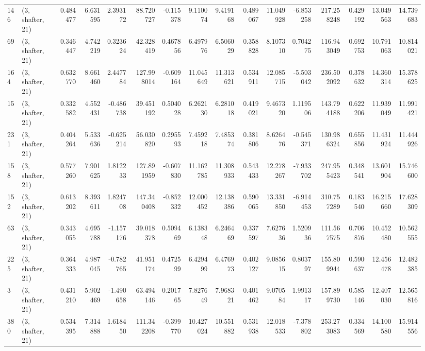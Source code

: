 \begin{tabular}{llrrrrrrrrrrrrrr}
146 &  (3, shafter, 21) &   0.484477 &   6.631595 &   2.393172 &    88.720727 &  -0.115378 &   9.110074 &   9.419168 &  0.489067 &  11.049928 &  -6.853258 &   217.258248 &   0.429192 &  13.049563 &  14.739683 \\
69  &  (3, shafter, 21) &   0.346447 &   4.742219 &   0.323624 &    42.328419 &   0.467856 &   6.497976 &   6.506029 &  0.358828 &   8.107310 &   0.704275 &   116.943049 &   0.692753 &  10.791063 &  10.814021 \\
164 &  (3, shafter, 21) &   0.632770 &   8.661460 &   2.447784 &   127.998014 &  -0.609164 &  11.045649 &  11.313621 &  0.534911 &  12.085715 &  -5.503042 &   236.502092 &   0.378632 &  14.360314 &  15.378625 \\
15  &  (3, shafter, 21) &   0.332582 &   4.552431 &  -0.486738 &    39.451192 &   0.504028 &   6.262130 &   6.281018 &  0.419021 &   9.467320 &   1.119506 &   143.794188 &   0.622206 &  11.939049 &  11.991421 \\
231 &  (3, shafter, 21) &   0.404264 &   5.533636 &  -0.625214 &    56.030820 &   0.295593 &   7.459218 &   7.485374 &  0.381806 &   8.626476 &  -0.545371 &   130.986324 &   0.655856 &  11.431924 &  11.444926 \\
158 &  (3, shafter, 21) &   0.577260 &   7.901625 &   1.812233 &   127.891959 &  -0.607830 &  11.162785 &  11.308933 &  0.543433 &  12.278267 &  -7.933702 &   247.955423 &   0.348541 &  13.601904 &  15.746600 \\
152 &  (3, shafter, 21) &   0.613202 &   8.393611 &   1.824708 &   147.340408 &  -0.852332 &  12.000452 &  12.138386 &  0.590065 &  13.331850 &  -6.914453 &   310.757289 &   0.183540 &  16.215660 &  17.628309 \\
63  &  (3, shafter, 21) &   0.343055 &   4.695788 &  -1.157176 &    39.018378 &   0.509469 &   6.138348 &   6.246469 &  0.337597 &   7.627636 &   1.520936 &   111.567575 &   0.706876 &  10.452480 &  10.562555 \\
225 &  (3, shafter, 21) &   0.364333 &   4.987045 &  -0.782765 &    41.951174 &   0.472599 &   6.429499 &   6.476973 &  0.402127 &   9.085615 &   0.803797 &   155.809944 &   0.590637 &  12.456478 &  12.482385 \\
3   &  (3, shafter, 21) &   0.431210 &   5.902469 &  -1.490658 &    63.494146 &   0.201765 &   7.827649 &   7.968321 &  0.401462 &   9.070584 &   1.991317 &   157.899730 &   0.585146 &  12.407030 &  12.565816 \\
380 &  (3, shafter, 21) &   0.534395 &   7.314888 &   1.618450 &   111.342208 &  -0.399770 &  10.427024 &  10.551882 &  0.531938 &  12.018533 &  -7.378802 &   253.273083 &   0.334569 &  14.100580 &  15.914556 \\

\end{tabular}
